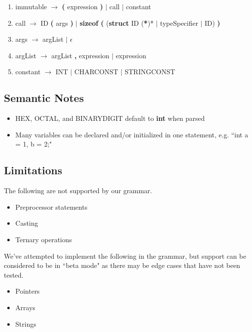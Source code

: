 \documentclass{scrartcl}
\begin{document}
\begin{enumerate}
\item immutable $\rightarrow$ 
    \textbf{(} expression \textbf{)} 
    $|$ call 
    $|$ constant

\item call $\rightarrow$ 
    ID \textbf{(} args \textbf{)}
    $|$ \textbf{sizeof (} (\textbf{struct} ID (\textbf{*})* $|$ typeSpecifier $|$ ID) \textbf{)}

\item args $\rightarrow$ 
    argList $|$ $\epsilon$

\item argList $\rightarrow$ 
    argList \textbf{,} expression $|$ expression

\item constant $\rightarrow$ 
    INT $|$ CHARCONST $|$ STRINGCONST
\end{enumerate}

\subsection{Semantic Notes}
\begin{itemize}
    \item HEX, OCTAL, and BINARYDIGIT default to \textbf{int} when parsed
    \item Many variables can be declared and/or initialized in one statement, e.g. ``int a = 1, b = 2;"
\end{itemize}

\subsection{Limitations}
The following are not supported by our grammar.
\begin{itemize}
    \item Preprocessor statements
    \item Casting
    \item Ternary operations
\end{itemize}
We've attempted to implement the following in the grammar, but support can be considered to be in ``beta mode" as there may be edge cases that have not been tested.
\begin{itemize}
    \item Pointers
    \item Arrays
    \item Strings
\end{itemize}
\end{document}
